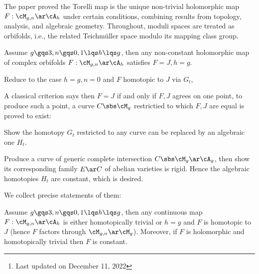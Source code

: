\documentclass[a4paper, twoside]{article}
\title{\tbf{Farb2021}}
\author{\tbf{Notes} by Cong Wen, 12/2022}
\date{}
\begin{document}
\maketitle
\thispagestyle{empty}
\begin{abstract}
	This is my self-use notes\footnote{Last updated on December 11, 2022} on \cite{Farb2021}. All possible faults are on my own for sure. Please reach out if you find anything incorrect.

\end{abstract}
\tableofcontents

The paper proved the Torelli map is the unique non-trivial holomorphic map $F:\cM_{g,n}\ar\cA_{h}$ under certain conditions, combining results from topology, analysis, and algebraic geometry. Throughout, moduli spaces are treated as orbifolds, i.e., the related Teichm{\"u}ller space modulo its mapping class group.


\begin{thm}[Theorem~1.1]
	Assume $g\gqs3, n\gqs0, 1\lqs h\lqs g$, then any non-constant holomorphic map of complex orbifolds $F:\cM_{g,n}\ar\cA_{h}$ satisfies $F=J, h=g$.
\end{thm}

\begin{enr}
	\item Reduce to the case $h=g, n=0$ and $F$ homotopic to $J$ via $G_{t}$,
	\item A classical criterion says then $F=J$ if and only if $F,J$ agrees on one point, to produce such a point, a curve $C\sbs\cM_{g}$ restrictied to which $F,J$ are equal is proved to exist:
	\begin{enr}
		\item Show the homotopy $G_{t}$ restricted to any curve can be replaced by an algebraic one $H_{t}$.
		\item Produce a curve of generic complete intersection $C\sbs\cM_{g}\ar\cA_{g}$, then show its corresponding family $E\ar C$ of abelian varieties is rigid. Hence the algebraic homotopies $H_{t}$ are constant, which is desired.
	\end{enr}
\end{enr}


We collect precise statements of them:


\begin{thm}
	Assume $g\gqs3, n\gqs0, 1\lqs h\lqs g$, then any continuous map $F:\cM_{g,n}\ar\cA_{h}$ is either homotopically trivial or $h=g$ and $F$ is homotopic to $J$ (hence $F$ factors through $\cM_{g,n}\ar\cM_{g}$). Moreover, if $F$ is holomorphic and homotopically trivial then $F$ is constant.
\end{thm}
\end{document}
